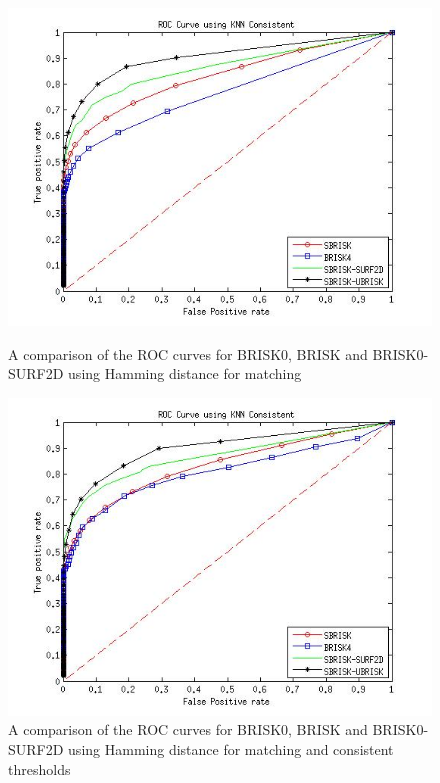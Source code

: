 \documentclass{article}
\begin{document}
\begin{figure}[h!]
\begin{minipage}[b]{0.5\linewidth}
\includegraphics[scale=0.5]{../Drawings/ROC_General_Hamming.jpg}
\caption{A comparison of the ROC curves for BRISK0, BRISK and BRISK0-SURF2D using Hamming distance for matching}
\label{fig:compareHamming}
\end{minipage}
\hspace{0.5cm}
\begin{minipage}[b]{0.5\linewidth}
\includegraphics[scale=0.5]{../Drawings/ROC_General_Hamming_Consistent.jpg}
\caption{A comparison of the ROC curves for BRISK0, BRISK and BRISK0-SURF2D using Hamming distance for matching and consistent thresholds}

\end{minipage}
\end{figure}
\end{document}
